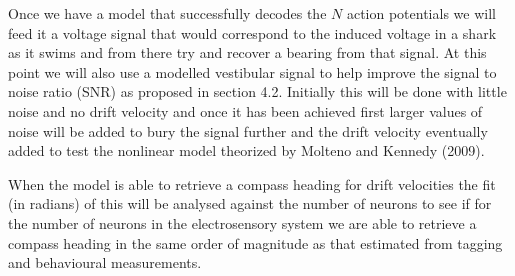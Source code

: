 \documentclass[12pt]{article}
\begin{document}
Once we have a model that successfully decodes the $N$ action potentials we will feed it a voltage signal that would correspond to the induced voltage in a shark as it swims and from there try and recover a bearing from that signal. At this point we will also use a modelled vestibular signal to help improve the signal to noise ratio (SNR) as proposed in section 4.2. Initially this will be done with little noise and no drift velocity and once it has been achieved first larger values of noise will be added to bury the signal further and the drift velocity eventually added to test the nonlinear model theorized by Molteno and Kennedy (2009).

When the model is able to retrieve a compass heading for drift velocities the fit (in radians) of this will be analysed against the number of neurons to see if for the number of neurons in the electrosensory system we are able to retrieve a compass heading in the same order of magnitude as that estimated from tagging and behavioural measurements.

{}

\end{document}
